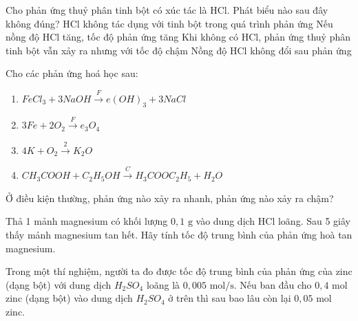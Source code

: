 \begin{ex}
	Cho phản ứng thuỷ phân tinh bột có xúc tác là HCl.
	Phát biểu nào sau đây không đúng?
	\choice
	{HCl không tác dụng với tinh bột trong quá trình phản ứng}
	{Nếu nồng độ HCl tăng, tốc độ phản ứng tăng}
	{\True Khi không có HCl, phản ứng thuỷ phân tinh bột vẫn xảy ra nhưng với tốc độ chậm}
	{Nồng độ HCl không đổi sau phản ứng}
\end{ex}
\begin{bt}
	Cho các phản ứng hoá học sau:
	\begin{enumerate}
		\item $FeCl_3 + 3NaOH \xrightarrow Fe(OH)_3 + 3NaCl$
		\item $3Fe + 2O_2 \xrightarrow Fe_3O_4$
		\item $4K + O_2 \xrightarrow 2K_2O$
		\item $CH_3COOH + C_2H_5OH \xrightarrow CH_3COOC_2H_5 + H_2O$
	\end{enumerate}
	Ở điều kiện thường, phản ứng nào xảy ra nhanh, phản ứng nào xảy ra chậm?
\end{bt}

\begin{bt}
	Thả 1 mảnh magnesium có khối lượng $0{,}1 \text{ g}$ vào dung dịch HCl loãng. Sau 5 giây thấy mảnh magnesium tan hết. Hãy tính tốc độ trung bình của phản ứng hoà tan magnesium.
\end{bt}
\begin{bt}
	Trong một thí nghiệm, người ta đo được tốc độ trung bình của phản ứng của zinc (dạng bột) với dung dịch $H_2SO_4$ loãng là $0{,}005 \text{ mol/s}$.
	Nếu ban đầu cho $0{,}4 \text{ mol}$ zinc (dạng bột) vào dung dịch $H_2SO_4$ ở trên thì sau bao lâu còn lại $0{,}05 \text{ mol}$ zinc.
\end{bt}

